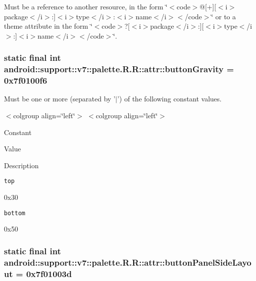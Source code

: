 Must be a reference to another resource, in the form \char`\"{}$<$code$>$@\mbox{[}+\mbox{]}\mbox{[}$<$i$>$package$<$/i$>$:\mbox{]}$<$i$>$type$<$/i$>$:$<$i$>$name$<$/i$>$$<$/code$>$\char`\"{} or to a theme attribute in the form \char`\"{}$<$code$>$?\mbox{[}$<$i$>$package$<$/i$>$:\mbox{]}\mbox{[}$<$i$>$type$<$/i$>$:\mbox{]}$<$i$>$name$<$/i$>$$<$/code$>$\char`\"{}. \hypertarget{classandroid_1_1support_1_1v7_1_1palette_1_1_r_1_1attr_6c963ebd1ffa9c2056f273d3dc704af0}{
\subsubsection[{buttonGravity}]{\setlength{\rightskip}{0pt plus 5cm}static final int android::support::v7::palette.R.R::attr::buttonGravity = 0x7f0100f6}}
\label{classandroid_1_1support_1_1v7_1_1palette_1_1_r_1_1attr_6c963ebd1ffa9c2056f273d3dc704af0}


Must be one or more (separated by '$|$') of the following constant values. \begin{TabularC}{0}
\hline
\end{TabularC}
$<$colgroup align=\char`\"{}left\char`\"{}$>$ $<$colgroup align=\char`\"{}left\char`\"{}$>$ 

Constant

Value

Description 

{\tt top}

0x30

{\tt bottom}

0x50\hypertarget{classandroid_1_1support_1_1v7_1_1palette_1_1_r_1_1attr_631295aa7c234bd4608a632941611d82}{
\subsubsection[{buttonPanelSideLayout}]{\setlength{\rightskip}{0pt plus 5cm}static final int android::support::v7::palette.R.R::attr::buttonPanelSideLayout = 0x7f01003d}}
\label{classandroid_1_1support_1_1v7_1_1palette_1_1_r_1_1attr_631295aa7c234bd4608a632941611d82}


